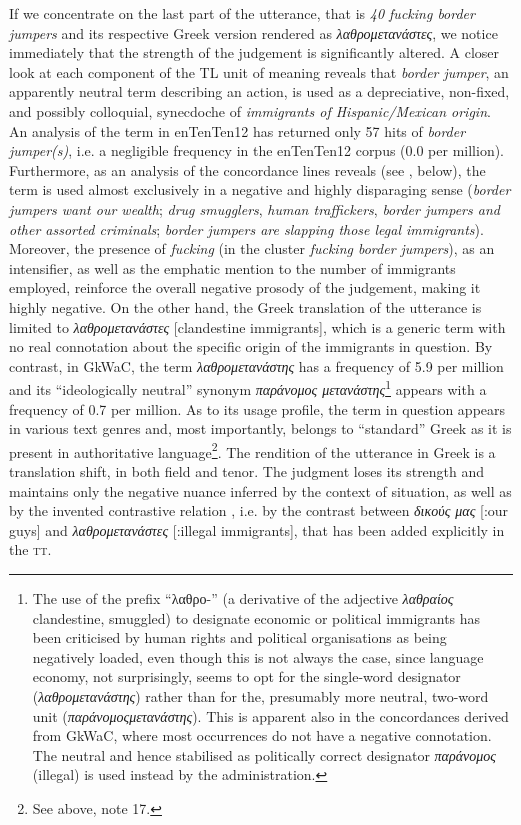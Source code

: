 \documentclass[output=paper]{LSP/langsci}
\begin{document}
If we concentrate on the last part of the utterance, that is \textit{40 fucking border jumpers} and its respective Greek version rendered as\textit{ λαθρομετανάστες}, we notice immediately that the strength of the judgement is significantly altered. A closer look at each component of the TL unit of meaning reveals that \textit{border jumper}, an apparently neutral term describing an action, is used as a depreciative, non-fixed, and possibly colloquial, synecdoche of \textit{immigrants of Hispanic/Mexican origin}. An analysis of the term in enTenTen12 has returned only 57 hits of \textit{border jumper(s)}, i.e. a negligible frequency in the enTenTen12 corpus (0.0 per million). Furthermore, as an analysis of the concordance lines reveals (see , below), the term is used almost exclusively in a negative and highly disparaging sense (\textit{border jumpers want our wealth}; \textit{drug smugglers}, \textit{human traffickers}, \textit{border jumpers and other assorted criminals}; \textit{border jumpers are slapping those legal immigrants}). Moreover, the presence of \textit{fucking} (in the cluster \textit{fucking border jumpers}), as an intensifier, as well as the emphatic mention to the number of immigrants employed, reinforce the overall negative prosody of the judgement, making it highly negative. On the other hand, the Greek translation of the utterance is limited to \textit{λαθρομετανάστες} [clandestine immigrants], which is a generic term with no real connotation about the specific origin of the immigrants in question. By contrast, in GkWaC, the term \textit{λαθρομετανάστης} has a frequency of 5.9 per million and its “ideologically neutral” synonym \textit{παράνομος μετανάστης}\footnote{The use of the prefix “λαθρο-” (a derivative of the adjective \textit{λαθραίος} {clandestine, smuggled}) to designate economic or political immigrants has been criticised by human rights and political organisations as being negatively loaded, even though this is not always the case, since language economy, not surprisingly, seems to opt for the single-word designator (\textit{λαθρομετανάστης}) rather than for the, presumably more neutral, two-word unit (\textit{παράνομοςμετανάστης}). This is apparent also in the concordances derived from GkWaC, where most occurrences do not have a negative connotation. The neutral and hence stabilised as politically correct designator \textit{παράνομος} (illegal) is used instead by the administration.} appears with a frequency of 0.7 per million. As to its usage profile, the term in question appears in various text genres and, most importantly, belongs to “standard” Greek as it is present in authoritative language\footnote{See above, note 17.}. The rendition of the utterance in Greek is a translation shift, in both field and tenor. The judgment loses its strength and maintains only the negative nuance inferred by the context of situation, as well as by the invented contrastive relation \citep[87-89]{Fairclough2003}, i.e. by the contrast between \textit{δικούς μας} [:our guys] and \textit{λαθρομετανάστες} [:illegal immigrants], that has been added explicitly in the \textsc{tt}.
\end{document}
